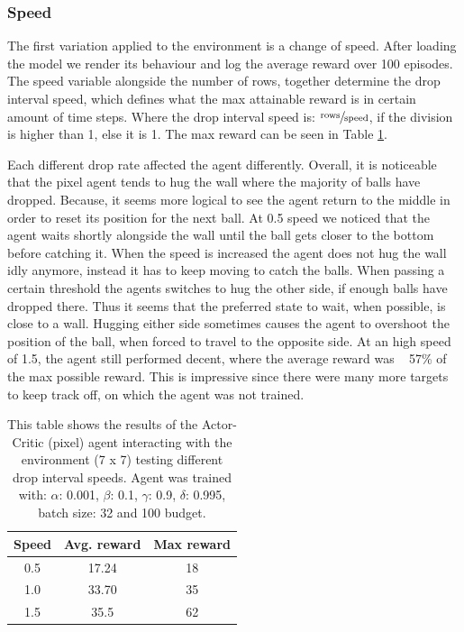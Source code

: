 \documentclass{article}
\begin{document}
\subsubsection{Speed}
The first variation applied to the environment is a change of speed.
After loading the model we render its behaviour and log the average reward over 100 episodes. 
The speed variable alongside the number of rows, together determine the drop interval speed, which defines what the max attainable reward is in certain amount of time steps. 
Where the drop interval speed is: $\sfrac{\text{rows}}{\text{speed}}$, if the division is higher than 1, else it is 1. 
The max reward can be seen in Table \ref{tab:Pixel-speed}. 

Each different drop rate affected the agent differently. 
Overall, it is noticeable that the pixel agent tends to hug the wall where the majority of balls have dropped.
Because, it seems more logical to see the agent return to the middle in order to reset its position for the next ball.
At 0.5 speed we noticed that the agent waits shortly alongside the wall until the ball gets closer to the bottom before catching it. 
When the speed is increased the agent does not hug the wall idly anymore, instead it has to keep moving to catch the balls. 
When passing a certain threshold the agents switches to hug the other side, if enough balls have dropped there. 
Thus it seems that the preferred state to wait, when possible, is close to a wall. 
Hugging either side sometimes causes the agent to overshoot the position of the ball, when forced to travel to the opposite side. 
At an high speed of 1.5, the agent still performed decent, where the average reward was ~ 57\% of the max possible reward. 
This is impressive since there were many more targets to keep track off, on which the agent was not trained. 

\begin{table}[htbp]
    \centering
    \begin{tabular}{|c|c|c|}
        \hline
        \textbf{Speed} & \textbf{Avg. reward} & \textbf{Max reward} \\
        \hline
        0.5   & 17.24       & 18                  \\
        1.0   & 33.70       & 35                  \\
        1.5   & 35.5        & 62          \\
        \hline          
    \end{tabular}
    \caption{This table shows the results of the Actor-Critic (pixel) agent interacting with the environment (7 x 7) testing different drop interval speeds.  Agent was trained with: $\alpha$: 0.001, $\beta$: 0.1, $\gamma$: 0.9, $\delta$: 0.995, batch size: 32 and 100 budget. }
    \label{tab:Pixel-speed}
\end{table}
\end{document}
